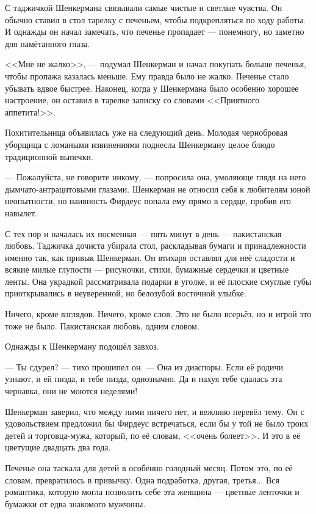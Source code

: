 С таджичкой Шенкермана связывали самые чистые и светлые чувства.
Он обычно ставил в стол тарелку с печеньем, чтобы подкрепляться по ходу работы.
И однажды он начал замечать, что печенье пропадает --- понемногу, но заметно для намётанного глаза.

<<Мне не жалко>>, --- подумал Шенкерман и начал покупать больше печенья, чтобы пропажа казалась меньше.
Ему правда было не жалко.
Печенье стало убывать вдвое быстрее.
Наконец, когда у Шенкермана было особенно хорошее настроение, он оставил в тарелке записку со словами <<Приятного аппетита!>>.

Похитительница объявилась уже на следующий день.
Молодая чернобровая уборщица с ломаными извинениями поднесла Шенкерману целое блюдо традиционной выпечки.

--- Пожалуйста, не говорите никому, --- попросила она, умоляюще глядя на него дымчато-антрацитовыми глазами.
Шенкерман не относил себя к любителям юной неопытности, но наивность Фирдеус попала ему прямо в сердце, пробив его навылет.

С тех пор и началась их посменная --- пять минут в день --- пакистанская любовь.
Таджичка дочиста убирала стол, раскладывая бумаги и принадлежности именно так, как привык Шенкерман.
Он втихаря оставлял для неё сладости и всякие милые глупости --- рисуночки, стихи, бумажные сердечки и цветные ленты.
Она украдкой рассматривала подарки в уголке, и её плоские смуглые губы приоткрывались в неуверенной, но белозубой восточной улыбке.

Ничего, кроме взглядов.
Ничего, кроме слов.
Это не было всерьёз, но и игрой это тоже не было.
Пакистанская любовь, одним словом.

Однажды к Шенкерману подошёл завхоз.

--- Ты сдурел? --- тихо прошипел он.
--- Она из диаспоры.
Если её родичи узнают, и ей пизда, и тебе пизда, однозначно.
Да и нахуя тебе сдалась эта чернавка, они не моются неделями!

Шенкерман заверил, что между ними ничего нет, и вежливо перевёл тему.
Он с удовольствием предложил бы Фирдеус встречаться, если бы у той не было троих детей и торговца-мужа, который, по её словам, <<очень болеет>>.
И это в её цветущие двадцать два года.

Печенье она таскала для детей в особенно голодный месяц.
Потом это, по её словам, превратилось в привычку.
Одна подработка, другая, третья...
Вся романтика, которую могла позволить себе эта женщина --- цветные ленточки и бумажки от едва знакомого мужчины.

